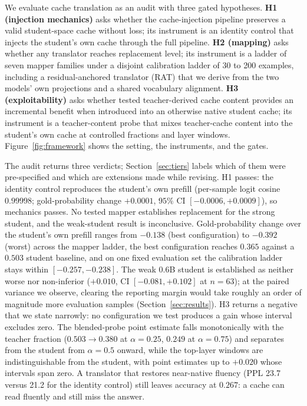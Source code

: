 \documentclass[10pt]{article}
\begin{document}
We evaluate cache translation as an audit with three gated hypotheses.
\textbf{H1 (injection mechanics)} asks whether the cache-injection pipeline preserves a valid
student-space cache without loss;
its instrument is an identity control that injects the student's own cache
through the full pipeline. \textbf{H2 (mapping)} asks whether any translator
reaches replacement level; its instrument is a ladder of seven mapper families
under a disjoint calibration ladder of 30 to 200 examples, including a
residual-anchored translator (RAT) that we derive from the two models' own
projections and a shared vocabulary alignment. \textbf{H3 (exploitability)}
asks whether tested teacher-derived cache content provides an incremental
benefit when introduced into an otherwise native student cache; its instrument
is a teacher-content probe that mixes teacher-cache content into
the student's own cache at controlled fractions and layer windows. Figure~\ref{fig:framework}
shows the setting, the instruments, and the gates.

The audit returns three verdicts; Section~\ref{sec:tiers} labels which of them
were pre-specified and which are extensions made while revising. H1 passes: the
identity control reproduces the student's own prefill (per-sample logit cosine
$0.99998$; gold-probability change $+0.0001$, $95\%$ CI $[-0.0006, +0.0009]$),
so mechanics passes. No tested mapper establishes replacement for the strong
student, and the weak-student result is inconclusive. Gold-probability change
over the student's own prefill ranges from $-0.138$
(best configuration) to $-0.392$ (worst) across the mapper ladder, the best
configuration reaches $0.365$ against a $0.503$ student baseline, and on one
fixed evaluation set the calibration ladder stays within $[-0.257, -0.238]$.
The weak 0.6B student is established as neither worse nor non-inferior
($+0.010$, CI $[-0.081, +0.102]$ at $n{=}63$); at the paired variance we
observe, clearing the reporting margin would take roughly an order of
magnitude more evaluation samples (Section~\ref{sec:results}). H3 returns a
negative that we state narrowly: no configuration we test produces a gain whose
interval excludes zero. The blended-probe point estimate falls monotonically
with the teacher fraction ($0.503 \to 0.380$ at $\alpha{=}0.25$, $0.249$ at
$\alpha{=}0.75$) and separates from the student from $\alpha{=}0.5$ onward,
while the top-layer windows are indistinguishable from the student, with point
estimates up to $+0.020$ whose intervals span zero. A translator that restores
near-native fluency (PPL 23.7 versus 21.2 for the identity control) still leaves
accuracy at $0.267$: a cache can read fluently and still miss the answer.
\end{document}
